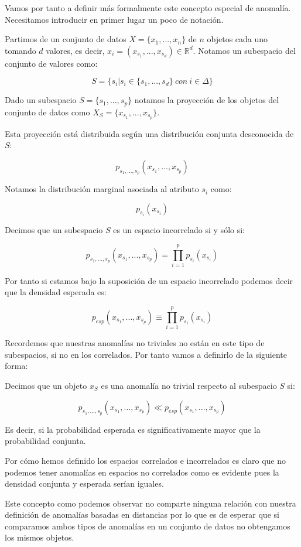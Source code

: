 Vamos por tanto a definir más formalmente este concepto especial de anomalía. Necesitamos introducir en primer lugar un poco de notación.

Partimos de un conjunto de datos $X = \{ x_1 , ... , x_n \}$ de $n$ objetos cada uno tomando $d$ valores, es decir, $x_i = (x_{s_1} , ... , x_{s_d}) \in \mathbb{R}^d$. Notamos un subespacio del conjunto de valores como:

$$S = \{ s_i | s_i \in \{ s_1 , ... , s_d \} \ con \ i\in \Delta \}$$

Dado un subespacio $S = \{ s_1 , ... , s_p \}$ notamos la proyección de los objetos del conjunto de datos como $X_{S} = \{ x_{s_1} , ... , x_{s_p} \}$.

Esta proyección está distribuida según una distribución conjunta desconocida de $S$:

$$p_{s_1 , ... , s_p} (x_{s_1} , ... , x_{s_p})$$

Notamos la distribución marginal asociada al atributo $s_i$ como:

$$p_{s_i}(x_{s_i})$$

\begin{definicion}
	Decimos que un subespacio $S$ es un espacio incorrelado si y sólo si:
	
	$$p_{s_1 , ... , s_p}(x_{s_1} , ... , x_{s_p}) = \prod_{i=1}^{p}p_{s_i}(x_{s_i})$$
\end{definicion}

Por tanto si estamos bajo la suposición de un espacio incorrelado podemos decir que la densidad esperada es:

$$p_{esp}(x_{s_1} , ... , x_{s_p}) \equiv \prod_{i=1}^{p}p_{s_i}(x_{s_i})$$

Recordemos que nuestras anomalías no triviales no están en este tipo de subespacios, si no en los correlados. Por tanto vamos a definirlo de la siguiente forma:

\begin{definicion}
	Decimos que un objeto $x_{S}$ es una anomalía no trivial respecto al subespacio $S$ si:
	
	$$p_{s_1 , ... , s_p}(x_{s_1} , ... , x_{s_p}) \ll p_{esp}(x_{s_1} , ... , x_{s_p})$$
	
	Es decir, si la probabilidad esperada es significativamente mayor que la probabilidad conjunta.
\end{definicion}

Por cómo hemos definido los espacios correlados e incorrelados es claro que no podemos tener anomalías en espacios no correlados como es evidente pues la densidad conjunta y esperada serían iguales.

Este concepto como podemos observar no comparte ninguna relación con nuestra definición de anomalías basadas en distancias por lo que es de esperar que si comparamos ambos tipos de anomalías en un conjunto de datos no obtengamos los mismos objetos.